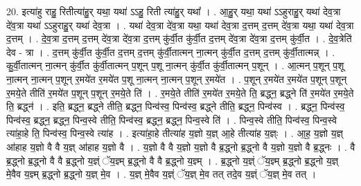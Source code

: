\documentclass[17pt]{extarticle}
\begin{document}
20. इत्या॑हु राहु॒ रितीत्या॑हु॒र् यथा॒ यथा॑ ऽऽहु॒ रिती त्या॑हु॒र् यथा᳚ । . आ॒हु॒र् यथा॒ यथा॑ ऽऽहुराहु॒र् यथा॑ देव॒त्रा दे॑व॒त्रा यथा॑ ऽऽहुराहु॒र् यथा॑ देव॒त्रा । . यथा॑ देव॒त्रा दे॑व॒त्रा यथा॒ यथा॑ देव॒त्रा द॒त्तम् द॒त्तम् दे॑व॒त्रा यथा॒ यथा॑ देव॒त्रा द॒त्तम् । . दे॒व॒त्रा द॒त्तम् द॒त्तम् दे॑व॒त्रा दे॑व॒त्रा द॒त्तम् कु॑र्वी॒त कु॑र्वी॒त द॒त्तम् दे॑व॒त्रा दे॑व॒त्रा द॒त्तम् कु॑र्वी॒त । . दे॒व॒त्रेति॑ देव - त्रा । . द॒त्तम् कु॑र्वी॒त कु॑र्वी॒त द॒त्तम् द॒त्तम् कु॑र्वी॒तात्मन् ना॒त्मन् कु॑र्वी॒त द॒त्तम् द॒त्तम् कु॑र्वी॒तात्मन्न् । . कु॒र्वी॒तात्मन् ना॒त्मन् कु॑र्वी॒त कु॑र्वी॒तात्मन् प॒शून् प॒शू ना॒त्मन् कु॑र्वी॒त कु॑र्वी॒तात्मन् प॒शून् । . आ॒त्मन् प॒शून् प॒शू ना॒त्मन् ना॒त्मन् प॒शून् र॒मये॑त र॒मये॑त प॒शू ना॒त्मन् ना॒त्मन् प॒शून् र॒मये॑त । . प॒शून् र॒मये॑त र॒मये॑त प॒शून् प॒शून् र॒मये॒ते तीति॑ र॒मये॑त प॒शून् प॒शून् र॒मये॒ते ति॑ । . र॒मये॒ते तीति॑ र॒मये॑त र॒मये॒ते ति॒ ब्रद्ध्न॒ ब्रद्ध्ने ति॑ र॒मये॑त र॒मये॒ते ति॒ ब्रद्ध्न॑ । . इति॒ ब्रद्ध्न॒ ब्रद्ध्ने तीति॒ ब्रद्ध्न॒ पिन्व॑स्व॒ पिन्व॑स्व॒ ब्रद्ध्ने तीति॒ ब्रद्ध्न॒ पिन्व॑स्व । . ब्रद्ध्न॒ पिन्व॑स्व॒ पिन्व॑स्व॒ ब्रद्ध्न॒ ब्रद्ध्न॒ पिन्व॒स्वे तीति॒ पिन्व॑स्व॒ ब्रद्ध्न॒ ब्रद्ध्न॒ पिन्व॒स्वे ति॑ । . पिन्व॒स्वे तीति॒ पिन्व॑स्व॒ पिन्व॒स्वे त्या॑हा॒हे ति॒ पिन्व॑स्व॒ पिन्व॒स्वे त्या॑ह । . इत्या॑हा॒हे तीत्या॑ह य॒ज्ञो य॒ज्ञ् आ॒हे तीत्या॑ह य॒ज्ञ्ः । . आ॒ह॒ य॒ज्ञो य॒ज्ञ् आ॑हाह य॒ज्ञो वै वै य॒ज्ञ् आ॑हाह य॒ज्ञो वै । . य॒ज्ञो वै वै य॒ज्ञो य॒ज्ञो वै ब्र॒द्ध्नो ब्र॒द्ध्नो वै य॒ज्ञो य॒ज्ञो वै ब्र॒द्ध्नः । . वै ब्र॒द्ध्नो ब्र॒द्ध्नो वै वै ब्र॒द्ध्नो य॒ज्ञ्ं ॅय॒ज्ञ्म् ब्र॒द्ध्नो वै वै ब्र॒द्ध्नो य॒ज्ञ्म् । . ब्र॒द्ध्नो य॒ज्ञ्ं ॅय॒ज्ञ्म् ब्र॒द्ध्नो ब्र॒द्ध्नो य॒ज्ञ् मे॒वैव य॒ज्ञ्म् ब्र॒द्ध्नो ब्र॒द्ध्नो य॒ज्ञ् मे॒व । . य॒ज्ञ् मे॒वैव य॒ज्ञ्ं ॅय॒ज्ञ् मे॒व तत् तदे॒व य॒ज्ञ्ं ॅय॒ज्ञ् मे॒व तत् । \newline
\end{document}
